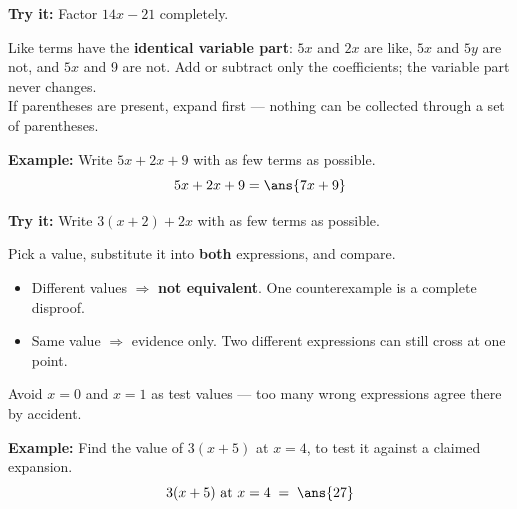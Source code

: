 \documentclass[12pt]{article}
\begin{document}
\begin{tryitbox}
\textbf{Try it:} Factor $14x - 21$ completely.\\[2pt]
\end{tryitbox}


\begin{formulabox}
Like terms have the \textbf{identical variable part}: $5x$ and $2x$ are like,
$5x$ and $5y$ are not, and $5x$ and 9 are not. Add or subtract only the
coefficients; the variable part never changes.\\[2pt]
If parentheses are present, expand first --- nothing can be collected through a
set of parentheses.
\end{formulabox}

\begin{examplebox}
\textbf{Example:} Write $5x + 2x + 9$ with as few terms as possible.
\[ 5x + 2x + 9 = \ans{7x+9} \]
\end{examplebox}

\begin{tryitbox}
\textbf{Try it:} Write $3(x+2) + 2x$ with as few terms as possible.\\[2pt]
\end{tryitbox}


\begin{formulabox}
Pick a value, substitute it into \textbf{both} expressions, and compare.
\begin{itemize}[leftmargin=0.9cm, itemsep=1pt, topsep=1pt]
\item Different values $\Rightarrow$ \textbf{not equivalent}. One counterexample
is a complete disproof.
\item Same value $\Rightarrow$ evidence only. Two different expressions can
still cross at one point.
\end{itemize}
Avoid $x = 0$ and $x = 1$ as test values --- too many wrong expressions agree
there by accident.
\end{formulabox}

\begin{examplebox}
\textbf{Example:} Find the value of $3(x+5)$ at $x = 4$, to test it against a
claimed expansion.
\[ 3(x+5) \text{ at } x=4 \;=\; \ans{27} \]
\end{examplebox}
\end{document}

